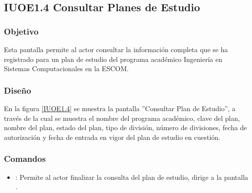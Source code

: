 \subsection{IUOE1.4 Consultar Planes de Estudio}

\subsubsection{Objetivo}
	Esta pantalla permite al actor consultar la información completa que se ha registrado para un plan de estudio del programa académico Ingeniería en Sistemas Computacionales en la ESCOM.

\subsubsection{Diseño}
	En la figura \ref{IUOE1.4} se muestra la pantalla ''Consultar Plan de Estudio'', a través de la cual se muestra el nombre del programa académico, clave del plan, nombre del plan, estado del plan, tipo de división, número de divisiones, fecha de autorización y fecha de entrada en vigor del plan de estudio en cuestión.


\subsubsection{Comandos}
\begin{itemize}
	\item {}: Permite al actor finalizar la consulta del plan de estudio, dirige a la pantalla .

\end{itemize}
